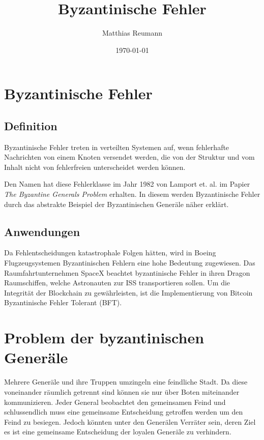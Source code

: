 \documentclass{article}
\title{Byzantinische Fehler}
\author{Matthias Reumann}
\date{\today}
\begin{document}
\maketitle

\newpage

\tableofcontents

\newpage

\section{Byzantinische Fehler}

\subsection{Definition}

Byzantinische Fehler treten in verteilten Systemen auf, 
wenn fehlerhafte Nachrichten von einem Knoten versendet werden, 
die von der Struktur und vom Inhalt nicht von fehlerfreien
unterscheidet werden können. \cite{esraberlin} 

\medskip 

Den Namen hat diese Fehlerklasse im Jahr 1982 von Lamport et. al. im 
Papier \textit{The Byzantine Generals Problem} erhalten.\cite{generals}
In diesem werden Byzantinische Fehler durch das abstrakte Beispiel der Byzantinischen Generäle näher erklärt.

\subsection{Anwendungen}
Da Fehlentscheidungen katastrophale Folgen hätten, wird in Boeing Flugzeugsystemen 
Byzantinischen Fehlern eine hohe Bedeutung zugewiesen.
Das Raumfahrtunternehmen SpaceX beachtet byzantinische Fehler in ihren Dragon Raumschiffen, 
welche Astronauten zur ISS transportieren sollen. 
Um die Integrität der Blockchain zu gewährleisten, ist die Implementierung von Bitcoin 
Byzantinische Fehler Tolerant (BFT).

\section{Problem der byzantinischen Generäle}
\label{sec:generals}
Mehrere Generäle und ihre Truppen umzingeln eine feindliche Stadt. 
Da diese voneinander räumlich getrennt sind können sie nur über Boten miteinander kommunizieren.
Jeder General beobachtet den gemeinsamen Feind und schlussendlich muss
eine gemeinsame Entscheidung getroffen werden um den Feind zu besiegen. 
Jedoch könnten unter den Generälen Verräter sein, deren Ziel es ist eine gemeinsame Entscheidung 
der loyalen Generäle zu verhindern. 
\end{document}
